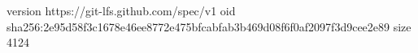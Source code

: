 version https://git-lfs.github.com/spec/v1
oid sha256:2e95d58f3c1678e46ee8772e475bfcabfab3b469d08f6f0af2097f3d9cee2e89
size 4124
